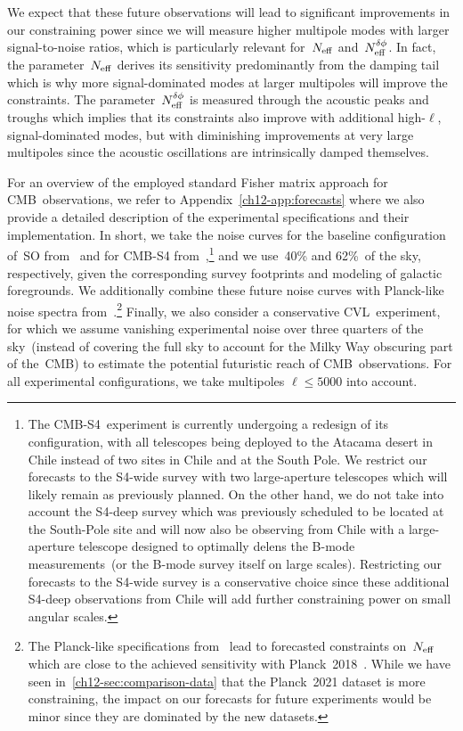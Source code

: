 We expect that these future observations will lead to significant improvements in our constraining power since we will measure higher multipole modes with larger signal-to-noise ratios, which is particularly relevant for~$N_\mathrm{eff}$ and~$N_\mathrm{eff}^{\delta\phi}$. In fact, the parameter~$N_\mathrm{eff}$ derives its sensitivity predominantly from the damping tail which is why more signal-dominated modes at larger multipoles will improve the constraints. The parameter~$N_\mathrm{eff}^{\delta\phi}$ is measured through the acoustic peaks and troughs which implies that its constraints also improve with additional high-$\ell$, signal-dominated modes, but with diminishing improvements at very large multipoles since the acoustic oscillations are intrinsically damped themselves.\medskip

For an overview of the employed standard Fisher matrix approach for CMB~observations, we refer to Appendix~\ref{ch12-app:forecasts} where we also provide a detailed description of the experimental specifications and their implementation. In short, we take the noise curves for the baseline configuration of~SO from~\cite{SimonsObservatory:2018koc, SimonsObservatory:2020noise} and for \mbox{CMB-S4} from~\cite{CMB-S4:inprep, Raghunathan:draft},\footnote{The \mbox{CMB-S4}~experiment is currently undergoing a redesign of its configuration, with all telescopes being deployed to the Atacama desert in Chile instead of two sites in Chile and at the South Pole. We restrict our forecasts to the S4-wide survey with two large-aperture telescopes which will likely remain as previously planned. On the other hand, we do not take into account the S4-deep survey which was previously scheduled to be located at the South-Pole site and will now also be observing from Chile with a large-aperture telescope designed to optimally delens the B-mode measurements~(or the B-mode survey itself on large scales). Restricting our forecasts to the S4-wide survey is a conservative choice since these additional S4-deep observations from Chile will add further constraining power on small angular scales.} and we use~40\% and 62\%~of the sky, respectively, given the corresponding survey footprints and modeling of galactic foregrounds. We additionally combine these future noise curves with Planck-like noise spectra from~\cite{Allison:2015qca}.\footnote{The Planck-like specifications from~\cite{Allison:2015qca} lead to forecasted constraints on~$N_\mathrm{eff}$ which are close to the achieved sensitivity with Planck~2018~\cite{Baumann:2017gkg}. While we have seen in~\textsection\ref{ch12-sec:comparison-data} that the Planck~2021 dataset is more constraining, the impact on our forecasts for future experiments would be minor since they are dominated by the new datasets.} Finally, we also consider a conservative CVL~experiment, for which we assume vanishing experimental noise over three quarters of the sky~(instead of covering the full sky to account for the Milky Way obscuring part of the~CMB) to estimate the potential futuristic reach of CMB~observations. For all experimental configurations, we take multipoles $\ell \leq 5000$ into account.

